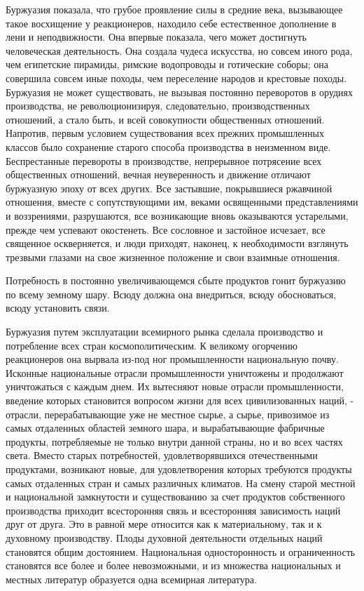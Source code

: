 \documentclass[12pt]{article}
\newcommand{\parnum}{(\arabic{parcount})}
\newcounter{parcount}
\newenvironment{parnumbers}{%
  \par%
  \everypar{\noindent \stepcounter{parcount}\marginpar[]{\parnum}}%
}{}
\begin{document}
\begin{parnumbers}
    Буржуазия показала, что грубое проявление силы в средние века, вызывающее такое восхищение у реакционеров, находило себе естественное дополнение в лени и неподвижности. Она впервые показала, чего может достигнуть человеческая деятельность. Она создала чудеса искусства, но совсем иного рода, чем египетские пирамиды, римские водопроводы и готические соборы; она совершила совсем иные походы, чем переселение народов и крестовые походы. Буржуазия не может существовать, не вызывая постоянно переворотов в орудиях производства, не революционизируя, следовательно, производственных отношений, а стало быть, и всей совокупности общественных отношений. Напротив, первым условием существования всех прежних промышленных классов было сохранение старого способа производства в неизменном виде. Беспрестанные перевороты в производстве, непрерывное потрясение всех общественных отношений, вечная неуверенность и движение отличают буржуазную эпоху от всех других. Все застывшие, покрывшиеся ржавчиной отношения, вместе с сопутствующими им, веками освященными представлениями и воззрениями, разрушаются, все возникающие вновь оказываются устарелыми, прежде чем успевают окостенеть. Все сословное и застойное исчезает, все священное оскверняется, и люди приходят, наконец, к необходимости взглянуть трезвыми глазами на свое жизненное положение и свои взаимные отношения.

    Потребность в постоянно увеличивающемся сбыте продуктов гонит буржуазию по всему земному шару. Всюду должна она внедриться, всюду обосноваться, всюду установить связи.

    Буржуазия путем эксплуатации всемирного рынка сделала производство и потребление всех стран космополитическим. К великому огорчению реакционеров она вырвала из-под ног промышленности национальную почву. Исконные национальные отрасли промышленности уничтожены и продолжают уничтожаться с каждым днем. Их вытесняют новые отрасли промышленности, введение которых становится вопросом жизни для всех цивилизованных наций, - отрасли, перерабатывающие уже не местное сырье, а сырье, привозимое из самых отдаленных областей земного шара, и вырабатывающие фабричные продукты, потребляемые не только внутри данной страны, но и во всех частях света. Вместо старых потребностей, удовлетворявшихся отечественными продуктами, возникают новые, для удовлетворения которых требуются продукты самых отдаленных стран и самых различных климатов. На смену старой местной и национальной замкнутости и существованию за счет продуктов собственного производства приходит всесторонняя связь и всесторонняя зависимость наций друг от друга. Это в равной мере относится как к материальному, так и к духовному производству. Плоды духовной деятельности отдельных наций становятся общим достоянием. Национальная односторонность и ограниченность становятся все более и более невозможными, и из множества национальных и местных литератур образуется одна всемирная литература.


\end{parnumbers}
\end{document}
